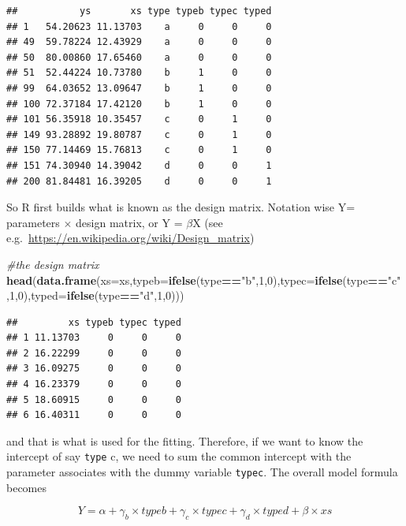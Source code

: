 \documentclass[
]{book}
\newenvironment{Shaded}{\begin{snugshade}}{\end{snugshade}}
\newcommand{\CommentTok}[1]{\textcolor[rgb]{0.56,0.35,0.01}{\textit{#1}}}
\newcommand{\DataTypeTok}[1]{\textcolor[rgb]{0.13,0.29,0.53}{#1}}
\newcommand{\DecValTok}[1]{\textcolor[rgb]{0.00,0.00,0.81}{#1}}
\newcommand{\KeywordTok}[1]{\textcolor[rgb]{0.13,0.29,0.53}{\textbf{#1}}}
\newcommand{\NormalTok}[1]{#1}
\newcommand{\OperatorTok}[1]{\textcolor[rgb]{0.81,0.36,0.00}{\textbf{#1}}}
\newcommand{\StringTok}[1]{\textcolor[rgb]{0.31,0.60,0.02}{#1}}
\begin{document}
\begin{verbatim}
##           ys       xs type typeb typec typed
## 1   54.20623 11.13703    a     0     0     0
## 49  59.78224 12.43929    a     0     0     0
## 50  80.00860 17.65460    a     0     0     0
## 51  52.44224 10.73780    b     1     0     0
## 99  64.03652 13.09647    b     1     0     0
## 100 72.37184 17.42120    b     1     0     0
## 101 56.35918 10.35457    c     0     1     0
## 149 93.28892 19.80787    c     0     1     0
## 150 77.14469 15.76813    c     0     1     0
## 151 74.30940 14.39042    d     0     0     1
## 200 81.84481 16.39205    d     0     0     1
\end{verbatim}

So R first builds what is known as the design matrix. Notation wise Y= parameters \(\times\) design matrix, or Y = \(\beta\)X (see e.g.~\url{https://en.wikipedia.org/wiki/Design_matrix})

\begin{Shaded}
\begin{Highlighting}[]
\CommentTok{#the design matrix}
\KeywordTok{head}\NormalTok{(}\KeywordTok{data.frame}\NormalTok{(}\DataTypeTok{xs=}\NormalTok{xs,}\DataTypeTok{typeb=}\KeywordTok{ifelse}\NormalTok{(type}\OperatorTok{==}\StringTok{"b"}\NormalTok{,}\DecValTok{1}\NormalTok{,}\DecValTok{0}\NormalTok{),}\DataTypeTok{typec=}\KeywordTok{ifelse}\NormalTok{(type}\OperatorTok{==}\StringTok{"c"}\NormalTok{,}\DecValTok{1}\NormalTok{,}\DecValTok{0}\NormalTok{),}\DataTypeTok{typed=}\KeywordTok{ifelse}\NormalTok{(type}\OperatorTok{==}\StringTok{"d"}\NormalTok{,}\DecValTok{1}\NormalTok{,}\DecValTok{0}\NormalTok{)))}
\end{Highlighting}
\end{Shaded}

\begin{verbatim}
##         xs typeb typec typed
## 1 11.13703     0     0     0
## 2 16.22299     0     0     0
## 3 16.09275     0     0     0
## 4 16.23379     0     0     0
## 5 18.60915     0     0     0
## 6 16.40311     0     0     0
\end{verbatim}

and that is what is used for the fitting. Therefore, if we want to know the intercept of say \texttt{type} c, we need to sum the common intercept with the parameter associates with the dummy variable \texttt{typec}. The overall model formula becomes

\[Y= \alpha + \gamma_b × typeb + \gamma_c × typec + \gamma_d × typed +  \beta × xs
\]
\end{document}
